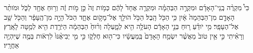 \documentclass{openreader}
\begin{document}
כִּי֩ מִקְרֶ֨ה בְֽנֵי־הָאָדָ֜ם וּמִקְרֶ֣ה הַבְּהֵמָ֗ה וּמִקְרֶ֤ה אֶחָד֙ לָהֶ֔ם כְּמֹ֥ות זֶה֙ כֵּ֣ן מֹ֣ות זֶ֔ה וְר֥וּחַ אֶחָ֖ד לַכֹּ֑ל וּמֹותַ֨ר הָאָדָ֤ם מִן־הַבְּהֵמָה֙ אָ֔יִן כִּ֥י הַכֹּ֖ל הָֽבֶל׃ 
הַכֹּ֥ל הֹולֵ֖ךְ אֶל־מָקֹ֣ום אֶחָ֑ד הַכֹּל֙ הָיָ֣ה מִן־הֶֽעָפָ֔ר וְהַכֹּ֖ל שָׁ֥ב אֶל־הֶעָפָֽר׃ 
מִ֣י יֹודֵ֗עַ ר֚וּחַ בְּנֵ֣י הָאָדָ֔ם הָעֹלָ֥ה הִ֖יא לְמָ֑עְלָה וְר֨וּחַ֙ הַבְּהֵמָ֔ה הַיֹּרֶ֥דֶת הִ֖יא לְמַ֥טָּה לָאָֽרֶץ׃ 
וְרָאִ֗יתִי כִּ֣י אֵ֥ין טֹוב֙ מֵאֲשֶׁ֨ר יִשְׂמַ֤ח הָאָדָם֙ בְּֽמַעֲשָׂ֔יו כִּי־ה֖וּא חֶלְקֹ֑ו כִּ֣י מִ֤י יְבִיאֶ֨נּוּ֙ לִרְאֹ֔ות בְּמֶ֖ה שֶׁיִּהְיֶ֥ה אַחֲרָֽיו׃ 
\end{document}
